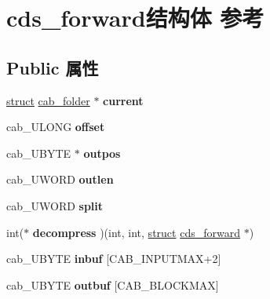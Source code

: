 \hypertarget{structcds__forward}{}\section{cds\+\_\+forward结构体 参考}
\label{structcds__forward}
\subsection*{Public 属性}
\begin{DoxyCompactItemize}
\item 
\mbox{\label{structcds__forward_a21d5a8e7dfb23989ca58c4716db97c78}} 
\hyperlink{interfacestruct}{struct} \hyperlink{structcab__folder}{cab\+\_\+folder} $\ast$ {\bfseries current}
\item 
\mbox{\label{structcds__forward_a67e5512a428e452eb2feffcd632106f1}} 
cab\+\_\+\+U\+L\+O\+NG {\bfseries offset}
\item 
\mbox{\label{structcds__forward_af0b3ce4e679cc503616f08ad28a92e1e}} 
cab\+\_\+\+U\+B\+Y\+TE $\ast$ {\bfseries outpos}
\item 
\mbox{\label{structcds__forward_a7f04d58378ff62142dff9638d708d276}} 
cab\+\_\+\+U\+W\+O\+RD {\bfseries outlen}
\item 
\mbox{\label{structcds__forward_ae426d12972e8cefc9afa4fb0d22dc43b}} 
cab\+\_\+\+U\+W\+O\+RD {\bfseries split}
\item 
\mbox{\label{structcds__forward_a7bca158a334bcd535b9a998da5c59b05}} 
int($\ast$ {\bfseries decompress} )(int, int, \hyperlink{interfacestruct}{struct} \hyperlink{structcds__forward}{cds\+\_\+forward} $\ast$)
\item 
\mbox{\label{structcds__forward_ac04603a73d399994d28ccc3d14005d5a}} 
cab\+\_\+\+U\+B\+Y\+TE {\bfseries inbuf} \mbox{[}C\+A\+B\+\_\+\+I\+N\+P\+U\+T\+M\+AX+2\mbox{]}
\item 
\mbox{\label{structcds__forward_a4a2ed4538375782aa65c98dcd30ec5fc}} 
cab\+\_\+\+U\+B\+Y\+TE {\bfseries outbuf} \mbox{[}C\+A\+B\+\_\+\+B\+L\+O\+C\+K\+M\+AX\mbox{]}

\end{DoxyCompactItemize}
